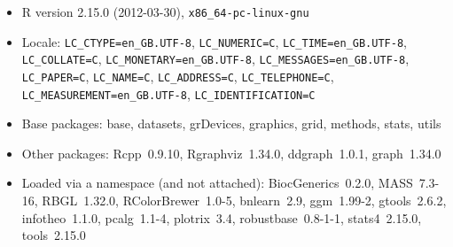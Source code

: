 \documentclass{article}
\begin{document}
\begin{itemize}\raggedright
  \item R version 2.15.0 (2012-03-30), \verb|x86_64-pc-linux-gnu|
  \item Locale: \verb|LC_CTYPE=en_GB.UTF-8|, \verb|LC_NUMERIC=C|, \verb|LC_TIME=en_GB.UTF-8|, \verb|LC_COLLATE=C|, \verb|LC_MONETARY=en_GB.UTF-8|, \verb|LC_MESSAGES=en_GB.UTF-8|, \verb|LC_PAPER=C|, \verb|LC_NAME=C|, \verb|LC_ADDRESS=C|, \verb|LC_TELEPHONE=C|, \verb|LC_MEASUREMENT=en_GB.UTF-8|, \verb|LC_IDENTIFICATION=C|
  \item Base packages: base, datasets, grDevices, graphics,
    grid, methods, stats, utils
  \item Other packages: Rcpp~0.9.10, Rgraphviz~1.34.0,
    ddgraph~1.0.1, graph~1.34.0
  \item Loaded via a namespace (and not attached):
    BiocGenerics~0.2.0, MASS~7.3-16, RBGL~1.32.0,
    RColorBrewer~1.0-5, bnlearn~2.9, ggm~1.99-2, gtools~2.6.2,
    infotheo~1.1.0, pcalg~1.1-4, plotrix~3.4,
    robustbase~0.8-1-1, stats4~2.15.0, tools~2.15.0
\end{itemize}


\end{document}
